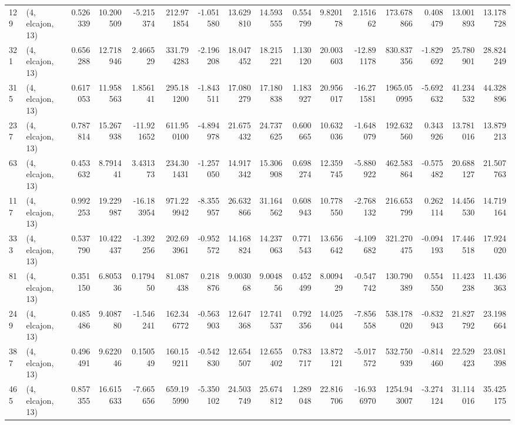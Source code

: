 \begin{tabular}{llrrrrrrrrrrrrrr}
129 &  (4, elcajon, 13) &   0.526339 &  10.200509 &  -5.215374 &   212.971854 &  -1.051580 &  13.629810 &  14.593555 &  0.554799 &   9.820178 &   2.151662 &   173.678866 &  0.408479 &  13.001893 &  13.178728 \\
321 &  (4, elcajon, 13) &   0.656288 &  12.718946 &   2.466529 &   331.794283 &  -2.196208 &  18.047452 &  18.215221 &  1.130120 &  20.003603 & -12.891178 &   830.837356 & -1.829692 &  25.780901 &  28.824249 \\
315 &  (4, elcajon, 13) &   0.617053 &  11.958563 &   1.856141 &   295.181200 &  -1.843511 &  17.080279 &  17.180838 &  1.183927 &  20.956017 & -16.271581 &  1965.050995 & -5.692632 &  41.234532 &  44.328896 \\
237 &  (4, elcajon, 13) &   0.787814 &  15.267938 & -11.921652 &   611.950100 &  -4.894978 &  21.675432 &  24.737625 &  0.600665 &  10.632036 &  -1.648079 &   192.632560 &  0.343926 &  13.781016 &  13.879213 \\
63  &  (4, elcajon, 13) &   0.453632 &   8.791441 &   3.431373 &   234.301431 &  -1.257050 &  14.917342 &  15.306908 &  0.698274 &  12.359745 &  -5.880922 &   462.583864 & -0.575482 &  20.688127 &  21.507763 \\
117 &  (4, elcajon, 13) &   0.992253 &  19.229987 & -16.183954 &   971.229942 &  -8.355957 &  26.632866 &  31.164562 &  0.608943 &  10.778550 &  -2.768132 &   216.653799 &  0.262114 &  14.456530 &  14.719164 \\
333 &  (4, elcajon, 13) &   0.537790 &  10.422437 &  -1.392256 &   202.693961 &  -0.952572 &  14.168824 &  14.237063 &  0.771543 &  13.656642 &  -4.109682 &   321.270475 & -0.094193 &  17.446518 &  17.924020 \\
81  &  (4, elcajon, 13) &   0.351150 &   6.805336 &   0.179450 &    81.087438 &   0.218876 &   9.003068 &   9.004856 &  0.452499 &   8.009429 &  -0.547742 &   130.790389 &  0.554550 &  11.423238 &  11.436363 \\
249 &  (4, elcajon, 13) &   0.485486 &   9.408780 &  -1.546241 &   162.346772 &  -0.563903 &  12.647368 &  12.741537 &  0.792356 &  14.025044 &  -7.856558 &   538.178020 & -0.832943 &  21.827792 &  23.198664 \\
387 &  (4, elcajon, 13) &   0.496491 &   9.622046 &   0.150549 &   160.159211 &  -0.542830 &  12.654507 &  12.655402 &  0.783717 &  13.872121 &  -5.017572 &   532.750939 & -0.814460 &  22.529423 &  23.081398 \\
465 &  (4, elcajon, 13) &   0.857355 &  16.615633 &  -7.665656 &   659.195990 &  -5.350102 &  24.503749 &  25.674812 &  1.289048 &  22.816706 & -16.936970 &  1254.943007 & -3.274124 &  31.114016 &  35.425175 \\

\end{tabular}
